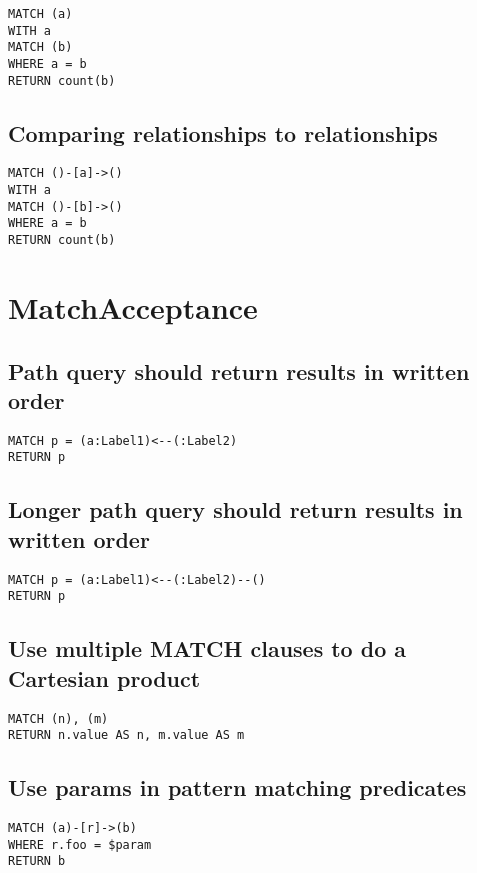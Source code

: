 \begin{lstlisting}
MATCH (a)
WITH a
MATCH (b)
WHERE a = b
RETURN count(b)
\end{lstlisting}

\subsection{Comparing relationships to relationships}

\begin{lstlisting}
MATCH ()-[a]->()
WITH a
MATCH ()-[b]->()
WHERE a = b
RETURN count(b)
\end{lstlisting}
\section{MatchAcceptance}


\subsection{Path query should return results in written order}

\begin{lstlisting}
MATCH p = (a:Label1)<--(:Label2)
RETURN p
\end{lstlisting}

\subsection{Longer path query should return results in written order}

\begin{lstlisting}
MATCH p = (a:Label1)<--(:Label2)--()
RETURN p
\end{lstlisting}

\subsection{Use multiple MATCH clauses to do a Cartesian product}

\begin{lstlisting}
MATCH (n), (m)
RETURN n.value AS n, m.value AS m
\end{lstlisting}

\subsection{Use params in pattern matching predicates}

\begin{lstlisting}
MATCH (a)-[r]->(b)
WHERE r.foo = $param
RETURN b
\end{lstlisting}

